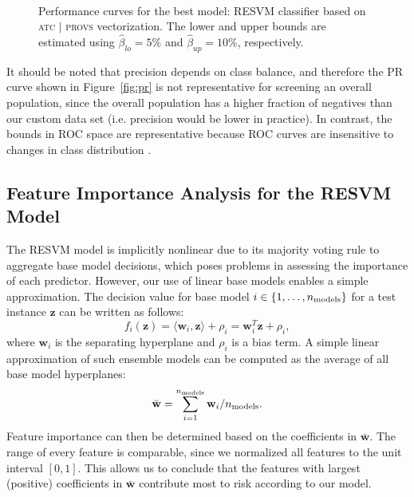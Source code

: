 \documentclass[twoside,11pt]{article}
\begin{document}
\begin{figure}[!h]
\centering
{}\qquad
{}\\
\caption{Performance curves for the best model: RESVM classifier based on \textsc{atc $|$ provs} vectorization. The lower and upper bounds are estimated using $\hat{\beta}_{lo}=5\%$ and $\hat{\beta}_{up}=10\%$, respectively. }
\label{fig:performance-curves}
\end{figure}

It should be noted that precision depends on class balance, and therefore the PR curve shown in Figure~\ref{fig:pr} is not representative for screening an overall population, since the overall population has a higher fraction of negatives than our custom data set (i.e. precision would be lower in practice). In contrast, the bounds in ROC space are representative because ROC curves are insensitive to changes in class distribution \citep{Fawcett:2006:IRA:1159473.1159475}.


\subsection{Feature Importance Analysis for the RESVM Model} \label{features}
The RESVM model is implicitly nonlinear due to its majority voting rule to aggregate base model decisions, which poses problems in assessing the importance of each predictor. However, our use of linear base models enables a simple approximation. The decision value for base model $i \in \{1,\ldots,n_{\rm models}\}$ for a test instance $\mathbf{z}$ can be written as follows:
\begin{equation*}
f_i(\mathbf{z}) = \langle \mathbf{w}_i, \mathbf{z}\rangle + \rho_i = \mathbf{w}_i^T\mathbf{z} + \rho_i,
\end{equation*}
where $\mathbf{w}_i$ is the separating hyperplane and $\rho_i$ is a bias term. A simple linear approximation of such ensemble models can be computed as the average of all base model hyperplanes:
\begin{equation*}
\bar{\mathbf{w}} = \sum_{i=1}^{n_{\rm models}} \mathbf{w}_i / n_{\rm models}.
\end{equation*}
Feature importance can then be determined based on the coefficients in $\bar{\mathbf{w}}$. The range of every feature is comparable, since we normalized all features to the unit interval $[0,1]$. This allows us to conclude that the features with largest (positive) coefficients in $\bar{\mathbf{w}}$ contribute most to risk according to our model. 
\end{document}
